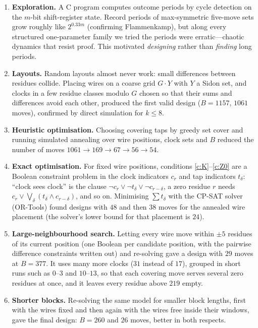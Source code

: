 \documentclass[11pt]{article}
\theoremstyle{definition}
\newcommand{\nmoves}{26}
\begin{document}
\begin{enumerate}[leftmargin=*]
\item \textbf{Exploration.}  A C program computes outcome periods by cycle detection on the
$m$-bit shift-register state.  Record periods of max-symmetric five-move sets grow roughly like
$2^{0.33m}$ (confirming Flammenkamp), but along every structured one-parameter family we tried the
periods were erratic---chaotic dynamics that resist proof.  This motivated \emph{designing} rather
than \emph{finding} long periods.
\item \textbf{Layouts.}  Random layouts almost never work: small differences between residues
collide.  Placing wires on a coarse grid $G\cdot Y$ with $Y$ a Sidon set, and clocks in a few
residue classes modulo $G$ chosen so that their sums and differences avoid each other, produced the
first valid design ($B=1157$, $1061$ moves), confirmed by direct simulation for $k\le 8$.
\item \textbf{Heuristic optimisation.}  Choosing covering taps by greedy set cover and running
simulated annealing over wire positions, clock sets and $B$ reduced the number of moves
$1061\to169\to 67\to 56\to 54$.
\item \textbf{Exact optimisation.}  For fixed wire positions, conditions \ref{c:K}--\ref{c:Z0} are
a Boolean constraint problem in the clock indicators $c_r$ and tap indicators $t_\delta$:
``clock sees clock'' is the clause $\neg c_r\vee\neg t_\delta\vee\neg c_{r-\delta}$, a zero residue $r$
needs $c_r\vee\bigvee_\delta(t_\delta\wedge c_{r-\delta})$, and so on.  Minimising $\sum t_\delta$ with the
CP-SAT solver (OR-Tools) found designs with $48$ and then $38$ moves for the annealed wire placement
(the solver's lower bound for that placement is $24$).
\item \textbf{Large-neighbourhood search.}  Letting every wire move within $\pm5$ residues of its current
position (one Boolean per candidate position, with the pairwise difference constraints written out)
and re-solving gave a design with $29$ moves at $B=377$.  It uses many more clocks ($31$ instead of
$17$), grouped in short runs such as $0$--$3$ and $10$--$13$, so that each covering move serves several
zero residues at once, and it leaves every residue above $219$ empty.
\item \textbf{Shorter blocks.}  Re-solving the same model for smaller block lengths, first with the
wires fixed and then again with the wires free inside their windows, gave the final design: $B=260$
and $\nmoves$ moves, better in both respects.
\end{enumerate}
\end{document}
